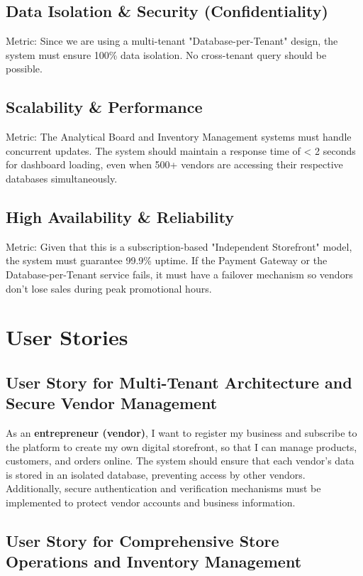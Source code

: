 \subsection{Data Isolation \& Security (Confidentiality)}
Metric: Since we are using a multi-tenant "Database-per-Tenant" design, the system must ensure 100\% data isolation. No cross-tenant query should be possible.

\subsection{Scalability \& Performance}
Metric: The Analytical Board and Inventory Management systems must handle concurrent updates. The system should maintain a response time of < 2 seconds for dashboard loading, even when 500+ vendors are accessing their respective databases simultaneously.

\subsection{High Availability \& Reliability}
Metric: Given that this is a subscription-based "Independent Storefront" model, the system must guarantee 99.9\% uptime. If the Payment Gateway or the Database-per-Tenant service fails, it must have a failover mechanism so vendors don't lose sales during peak promotional hours.

\section{User Stories}

\subsection{User Story for Multi-Tenant Architecture and Secure Vendor Management}

As an \textbf{entrepreneur (vendor)}, I want to register my business and subscribe to the platform to create my own digital storefront, so that I can manage products, customers, and orders online. The system should ensure that each vendor’s data is stored in an isolated database, preventing access by other vendors. Additionally, secure authentication and verification mechanisms must be implemented to protect vendor accounts and business information.

\subsection{User Story for Comprehensive Store Operations and Inventory Management}

